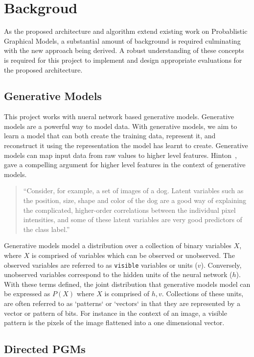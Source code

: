\chapter{Backgroud}

As the proposed architecture and algorithm extend existing work on Probablistic Graphical Models, a substantial amount of background is required culminating with the new approach being derived. A robust understanding of these concepts is required for this project to implement and design appropriate evaluations for the proposed architecture.

\section{Generative Models}\label{S:Generative-Models}

This project works with nueral network based generative models.
Generative models are a powerful way to model data. With generative models, we aim to learn a model that can both create the training data, represent it, and reconstruct it using the representation the model has learnt to create. Generative models can map input data from raw values to higher level features. Hinton~\cite{hinton:32723:vv}, gave a compelling argument for higher level features in the context of generative models. \begin{quote} ``Consider, for example, a set of images of a dog. Latent variables such as the position, size, shape and color of the dog are a good way of explaining the complicated, higher-order correlations between the individual pixel intensities, and some of these latent variables are very good predictors of the class label.''\end{quote}

Generative models model a distribution over a collection of binary variables $X$, where $X$ is comprised of variables which can be observed or unobserved. The observed variables are referred to as \texttt{visible} variables or units ($v$). Conversely, unobserved variables correspond to the hidden units of the neural network ($h$). With these terms defined, the joint distribution that generative models model can be expressed as $P(X)$ where $X$ is comprised of $h,v$. Collections of these units, are often referred to as `patterns` or `vectors` in that they are represented by a vector or pattern of bits. For instance in the context of an image, a visible pattern is the pixels of the image flattened into a one dimensional vector.

\section{Directed PGMs}

